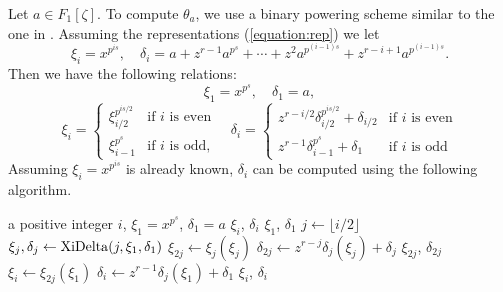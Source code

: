 \documentclass[12pt]{article}
\theoremstyle{plain}
\theoremstyle{definition}
\newcounter{algorithm}
\begin{document}
Let $a \in F_1[\zeta]$. To compute $\theta_a$, we use a binary powering scheme similar to the one in \cite{doliskanischost2011}. Assuming the representations (\ref{equation:rep}) we let 
\[
\xi_i = x^{p^{is}}, \quad
\delta_i = a + z^{r - 1}a^{p^s} + \cdots + z^2a^{p^{(i - 1)s}} + z^{r - i + 1} a^{p^{(i - 1)s}}.
\]
Then we have the following relations:
\[\xi_1 = x^{p^s}, \quad \delta_1 = a, \]
\[
\xi_i =
\begin{cases}
\xi_{i / 2}^{p^{is / 2}} & \text{if $i$ is even}  \\
\xi_{i - 1}^{p^s} & \text{if $i$ is odd,}
\end{cases} \quad
\delta_i=
\begin{cases}
	z^{r - i / 2}\delta_{i / 2}^{p^{is / 2}} + \delta_{i / 2} & \text{if $i$ is even} \\
	z^{r - 1}\delta_{i - 1}^{p^s} + \delta_1 & \text{if $i$ is odd}
\end{cases}
\]
Assuming $\xi_i = x^{p^{is}}$ is already known, $\delta_i$ can be computed using the following algorithm.

\begin{algorithm}
\label{algorithm:xidelta}
	\begin{algorithmic}[1]
		\REQUIRE a positive integer $i$, $\xi_1 = x^{p^s}$, $\delta_1 = a$
		\ENSURE $\xi_i$, $\delta_i$
			\RETURN $\xi_1$, $\delta_1$
		\ENDIF
		\STATE $j \leftarrow \lfloor i/2\rfloor$
		\STATE $\xi_{j}, \delta_j \leftarrow {\rm XiDelta}(j,\xi_1,\delta_1)$ 
		\STATE\label{step:xi} $\xi_{2j} \leftarrow \xi_j(\xi_j)$
		\STATE\label{step:delta} $\delta_{2j} \leftarrow z^{r - j}\delta_j(\xi_j) + \delta_j$
			\RETURN $\xi_{2j}$, $\delta_{2j}$
		\ENDIF
		\STATE $\xi_i \leftarrow \xi_{2j}(\xi_1)$
		\STATE $\delta_i \leftarrow z^{r - 1}\delta_j(\xi_1) + \delta_1$
		\RETURN $\xi_i$, $\delta_i$
	\end{algorithmic}
\end{algorithm}
\end{document}
